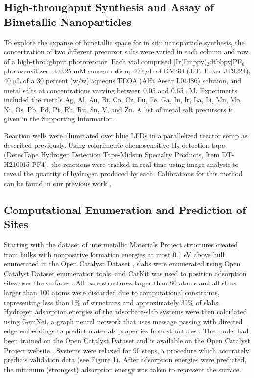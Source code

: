 \documentclass[preprint,12pt]{elsarticle}
\begin{document}
\subsection{High-throughput Synthesis and Assay of Bimetallic Nanoparticles}
To explore the expanse of bimetallic space for in situ nanoparticle synthesis, the concentration of two different precursor salts were varied in each column and row of a high-throughput photoreactor. Each vial comprised [Ir(Fmppy)$_2$dtbbpy]PF$_6$ photosensitizer at 0.25 mM concentration, 400 $\mu$L of DMSO (J.T. Baker JT9224), 40 $\mathrm{\mu}$L of a 30 percent (w/w) aqueous TEOA (Alfa Aesar L04486) solution, and metal salts at concentrations varying between 0.05 and 0.65 $\mathrm{\mu}$M. Experiments included the metals Ag, Al, Au, Bi, Co, Cr, Eu, Fe, Ga, In, Ir, La, Li, Mn, Mo, Ni, Os, Pb, Pd, Pt, Rh, Ru, Sn, V, and Zn. A list of metal salt precursors is given in the Supporting Information.

Reaction wells were illuminated over blue LEDs in a parallelized reactor setup as described previously. Using colorimetric chemosensitive H$_2$ detection tape (DetecTape Hydrogen Detection Tape-Midsun Specialty Products, Item DT-H210015-PF4), the reactions were tracked in real-time using image analysis to reveal the quantity of hydrogen produced by each. Calibrations for this method can be found in our previous work \cite{lopato2020parallelized}.


\subsection{Computational Enumeration and Prediction of Sites}\label{Section:Experimental/Enumeration}
Starting with the dataset of intermetallic Materials Project structures created from bulks with nonpositive formation energies at most 0.1 eV above hull enumerated in the Open Catalyst Dataset \cite{chanussot2021open,ong2013python}, slabs were enumerated using Open Catalyst Dataset enumeration tools, and CatKit was used to position adsorption sites over the surfaces \cite{boes2019graph}. All bare structures larger than 80 atoms and all slabs larger than 100 atoms were discarded due to computational constraints, representing less than 1\% of structures and approximately 30\% of slabs. Hydrogen adsorption energies of the adsorbate-slab systems were then calculated using GemNet, a graph neural network that uses message passing with directed edge embeddings to predict materials properties from structures \cite{klicpera2021gemnet}. The model had been trained on the Open Catalyst Dataset and is available on the Open Catalyst Project website \cite{chanussot2021open}. Systems were relaxed for 90 steps, a procedure which accurately predicts validation data (see Figure 1). After adsorption energies were predicted, the minimum (strongest) adsorption energy was taken to represent the surface. 
\end{document}
